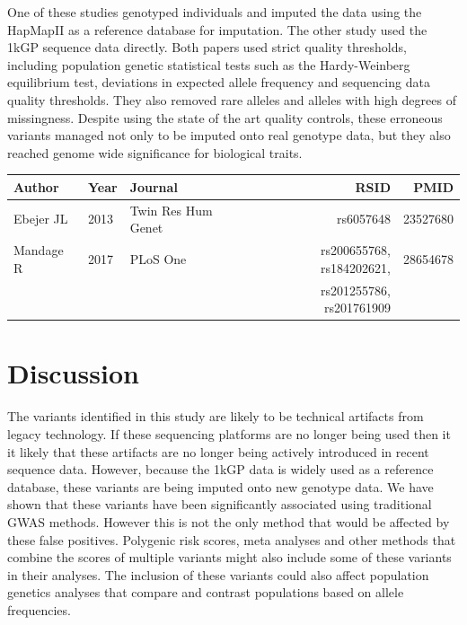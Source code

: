 \documentclass[9pt,lineno]{elife}
\begin{document}
One of these studies genotyped individuals and imputed the data using the HapMapII as a reference  database for imputation. 
The other study used the 1kGP sequence data directly.
Both papers used strict quality thresholds, including population genetic statistical tests such as the Hardy-Weinberg equilibrium test, deviations in expected allele frequency and sequencing data quality thresholds. 
They also removed rare alleles and alleles with high degrees of missingness. 
Despite using the state of the art quality controls, these erroneous variants managed not only to be imputed onto real genotype data, but they also reached genome wide significance for biological traits.



\begin{center}
 \begin{tabular}{l l l r r} 
 \hline
Author & Year & Journal & RSID & PMID \\ [0.5ex] 
 \hline
Ebejer JL	& 2013	 & Twin Res Hum Genet & 	rs6057648&23527680\\ 
 
Mandage R &	2017	 & PLoS One	 & rs200655768, rs184202621,&28654678\\
& & & rs201255786, rs201761909&\\
 \hline
 \end{tabular}
\end{center}

			\section{Discussion}
The variants identified in this study are likely to be technical artifacts from legacy technology.
If these sequencing platforms are no longer being used then it it likely that these artifacts are no longer being actively introduced in recent sequence data.
However, because the 1kGP data is widely used as a reference database, these variants are being imputed onto new genotype data.
We have shown that these variants have been significantly associated using traditional GWAS methods.
However this is not the only method that would be affected by these false positives. 
Polygenic risk scores, meta analyses and other methods that combine the scores of multiple variants might also include some of these variants in their analyses.
The inclusion of these variants could also affect population genetics analyses that compare and contrast populations based on allele frequencies.
\end{document}
